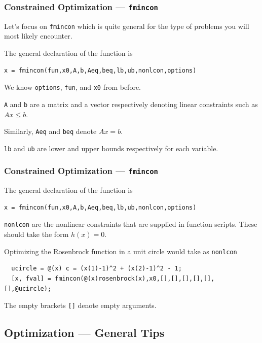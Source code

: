 \documentclass[11pt,xcolor={svgnames},aspectratio=169,usepdftitle=false]{beamer}
\let\toneitemize\itemize
\let\ttwoitemize\enditemize
\renewenvironment{itemize}{\toneitemize\addtolength{\itemsep}{0.7\baselineskip}}{\ttwoitemize}
\begin{document}
\begin{frame}[fragile]
  \frametitle{Constrained Optimization --- \texttt{fmincon}}
\begin{itemize}
  \item Let's focus on \verb;fmincon; which is quite general for the type of problems you will most likely encounter.
  \item The general declaration of the function is
\begin{lstlisting}
x = fmincon(fun,x0,A,b,Aeq,beq,lb,ub,nonlcon,options)
\end{lstlisting}
  \item We know \verb;options;, \verb;fun;, and \verb;x0; from before.
  \item \verb;A; and \verb;b; are a matrix and a vector respectively denoting linear constraints such as $Ax\leq b$.
  \item Similarly, \verb;Aeq; and \verb;beq; denote $Ax = b$.
  \item \verb;lb; and \verb;ub; are lower and upper bounds respectively for each variable.
\end{itemize}
\end{frame}

\begin{frame}[fragile]
  \frametitle{Constrained Optimization --- \texttt{fmincon}}
\begin{itemize}
  \item The general declaration of the function is
\begin{lstlisting}
x = fmincon(fun,x0,A,b,Aeq,beq,lb,ub,nonlcon,options)
\end{lstlisting}
  \item \verb;nonlcon; are the nonlinear constraints that are supplied in function scripts. These should take the form $h(x) = 0$.
  \item Optimizing the Rosenbrock function in a unit circle would take as \verb;nonlcon;
  \begin{lstlisting}
  ucircle = @(x) c = (x(1)-1)^2 + (x(2)-1)^2 - 1;
  [x, fval] = fmincon(@(x)rosenbrock(x),x0,[],[],[],[],[],[],@ucircle);
  \end{lstlisting}
  \item The empty brackets \verb;[]; denote empty arguments.
\end{itemize}
\end{frame}

\subsection{Optimization --- General Tips}
\end{document}
